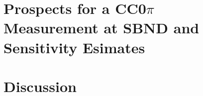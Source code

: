 \documentclass[11pt]{article}
\begin{document}


\section{Prospects for a CC0\( \pi \) Measurement at SBND and Sensitivity Esimates}
\label{sec:Prospects}




\section{Discussion}



\newpage





\end{document}
